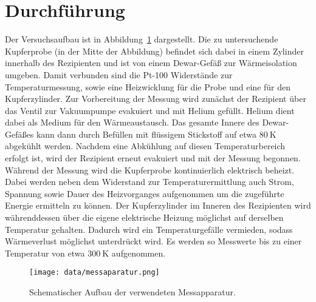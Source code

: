 \section{Durchführung}
\label{sec:durchführung}
%
Der Versuchsaufbau ist in Abbildung~\ref{fig:aufbau} dargestellt. Die zu untersuchende Kupferprobe (in der Mitte der Abbildung)
befindet sich dabei in einem Zylinder innerhalb des Rezipienten und ist von einem Dewar-Gefäß zur Wärmeisolation umgeben. Damit
verbunden sind die Pt-100 Widerstände zur Temperaturmessung, sowie eine Heizwicklung für die Probe und eine für den Kupferzylinder.
Zur Vorbereitung der Messung wird zunächst der Rezipient über das Ventil zur Vakuumpumpe evakuiert und mit Helium gefüllt. Helium
dient dabei als Medium für den Wärmeaustausch. Das gesamte Innere des Dewar-Gefäßes kann dann durch Befüllen mit flüssigem
Stickstoff auf etwa $\SI{80}{\kelvin}$ abgekühlt werden. Nachdem eine Abkühlung auf diesen Temperaturbereich erfolgt ist, wird der
Rezipient erneut evakuiert und mit der Messung begonnen.
Während der Messung wird die Kupferprobe kontinuierlich elektrisch beheizt. Dabei werden neben dem Widerstand zur
Temperaturermittlung auch Strom, Spannung sowie Dauer des Heizvorganges aufgenommen um die zugeführte Energie ermitteln zu können.
Der Kupferzylinder im Inneren des Rezipienten wird währenddessen über die eigene elektrische Heizung möglichst auf derselben
Temperatur gehalten. Dadurch wird ein Temperaturgefälle vermieden, sodass Wärmeverlust möglichst unterdrückt wird. Es werden so
Messwerte bis zu einer Temperatur von etwa $\SI{300}{\kelvin}$ aufgenommen.

\begin{figure}
    \centering
    \texttt{[image: data/messaparatur.png]}
    \caption{Schematischer Aufbau der verwendeten Messapparatur.\cite{V47}}
    \label{fig:aufbau}
\end{figure}